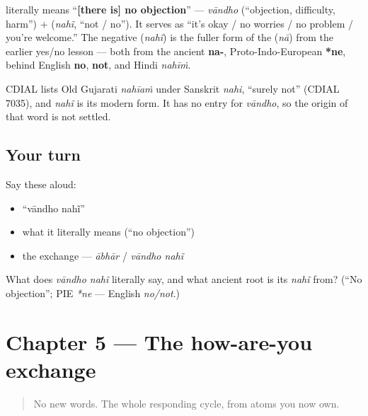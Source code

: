 \begin{cousinweb}
\textbf{ } literally means \textquotedblleft{}\textbf{{[}there is{]} no objection}\textquotedblright{} — \emph{vāndho} (\textquotedblleft{}objection, difficulty, harm\textquotedblright{}) + \textbf{} (\emph{nahĩ}, \textquotedblleft{}not / no\textquotedblright{}). It serves as \textquotedblleft{}it's okay / no worries / no problem / you're welcome.\textquotedblright{} The negative \textbf{} (\emph{nahĩ}) is the fuller form of the \textbf{} (\emph{nā}) from the earlier yes/no lesson — both from the ancient \textbf{na-}, Proto-Indo-European \textbf{*ne}, behind English \textbf{no}, \textbf{not}, and Hindi \emph{nahīṁ}.

CDIAL lists Old Gujarati \emph{nahīaṁ} under Sanskrit \emph{nahi}, \textquotedblleft{}surely not\textquotedblright{} (CDIAL 7035), and \emph{nahĩ} is its modern form. It has no entry for \emph{vāndho}, so the origin of that word is not settled.
\end{cousinweb}

\subsection*{Your turn}
Say these aloud:

\begin{itemize}
\raggedright
  \item \textquotedblleft{}vāndho nahĩ\textquotedblright{}
  \item what it literally means (\textquotedblleft{}no objection\textquotedblright{})
  \item the exchange — \emph{ābhār} / \emph{vāndho nahĩ}
\end{itemize}

\begin{tcolorbox}[breakable,colback=teal!4,colframe=teal!35!black,title={Before you move on}]
What does \emph{vāndho nahĩ} literally say, and what ancient root is its \emph{nahĩ} from? (\textquotedblleft{}No objection\textquotedblright{}; PIE \emph{*ne} — English \emph{no/not}.)
\end{tcolorbox}
\section[Practice]{Chapter 5 — The how-are-you exchange}

\label{lesson:GU-C03-practice}



\begin{quote}
No new words. The whole responding cycle, from atoms you now own.
\end{quote}

